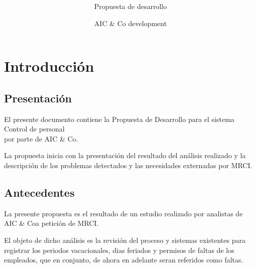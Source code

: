 \documentclass[10pt]{book}
\title{\nombreProyecto\\}
\subtitle{\bigskip Propuesta de desarrollo}
\author{AIC \& Co development }
\newcommand{\nombreProyecto}{ Control de personal}
\newcommand{\empresa}{AIC \& Co}
\newcommand{\cliente}{MRCI}
\begin{document}
 


\pagestyle{empty}
\maketitle


\chapter{Introducción} 

\section{Presentación}

	El presente documento contiene la Propuesta de Desarrollo para el sistema \nombreProyecto  \\    por parte de  \empresa.
	
	La propuesta inicia con la presentación del resultado del análisis realizado y la descripción de los problemas detectados y las necesidades externadas por \cliente.

\section{Antecedentes} 


	La presente propuesta es el resultado de un estudio realizado por analistas de \empresa a petición de \cliente.
	
	El objeto de dicho análisis es la revisión del proceso y sistemas existentes para registrar los periodos vacacionales, dias feriados y permisos de faltas de los empleados, que en conjunto, de ahora en adelante seran referidos como faltas. 
	





\end{document}
